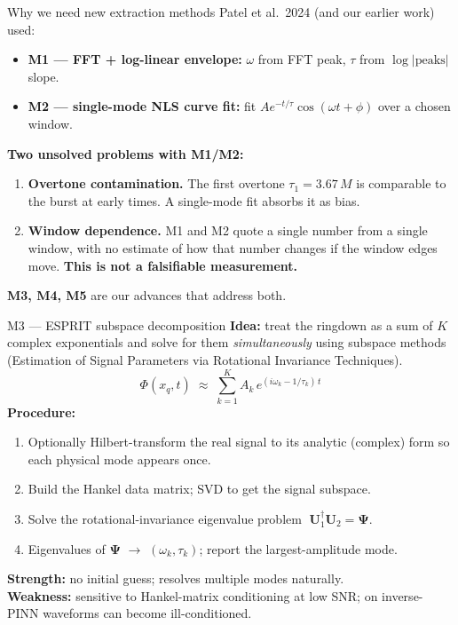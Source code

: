 \documentclass[aspectratio=169, 11pt]{beamer}
\begin{document}
\begin{frame}{Why we need new extraction methods}
  Patel et al.\ 2024 (and our earlier work) used:
  \medskip
  \begin{itemize}
    \item \textbf{M1 --- FFT + log-linear envelope:}
          $\omega$ from FFT peak, $\tau$ from $\log|\text{peaks}|$ slope.
    \item \textbf{M2 --- single-mode NLS curve fit:}
          fit $A e^{-t/\tau}\cos(\omega t+\phi)$ over a chosen window.
  \end{itemize}
  \medskip
  \textbf{Two unsolved problems with M1/M2:}
  \begin{enumerate}\small
    \item \textbf{Overtone contamination.} The first overtone
          $\tau_{1}\!=\!3.67\,M$ is comparable to the burst at early times.
          A single-mode fit absorbs it as bias.
    \item \textbf{Window dependence.} M1 and M2 quote a single number
          from a single window, with no estimate of how that number
          changes if the window edges move. \textbf{This is not a falsifiable
          measurement.}
  \end{enumerate}
  \medskip
  \textbf{M3, M4, M5} are our advances that address both.
\end{frame}

\begin{frame}{M3 --- ESPRIT subspace decomposition}
  \textbf{Idea:} treat the ringdown as a sum of $K$ complex exponentials
  and solve for them \emph{simultaneously} using subspace methods
  (Estimation of Signal Parameters via Rotational Invariance Techniques).
  \medskip
  \[
    \Phi(x_{q},t)
    \;\approx\; \sum_{k=1}^{K} A_{k}\,e^{(i\omega_{k} - 1/\tau_{k})\,t}
  \]
  \medskip
  \textbf{Procedure:}
  \begin{enumerate}\small
    \item Optionally Hilbert-transform the real signal to its analytic
          (complex) form so each physical mode appears once.
    \item Build the Hankel data matrix; SVD to get the signal subspace.
    \item Solve the rotational-invariance eigenvalue problem
          $\;\mathbf{U}_{1}^{\dagger}\mathbf{U}_{2} = \boldsymbol{\Psi}$.
    \item Eigenvalues of $\boldsymbol{\Psi}$ $\to$ $(\omega_{k}, \tau_{k})$;
          report the largest-amplitude mode.
  \end{enumerate}
  \medskip
  \textbf{Strength:} no initial guess; resolves multiple modes naturally.\\
  \textbf{Weakness:} sensitive to Hankel-matrix conditioning at low SNR;
  on inverse-PINN waveforms can become ill-conditioned.
\end{frame}
\end{document}
